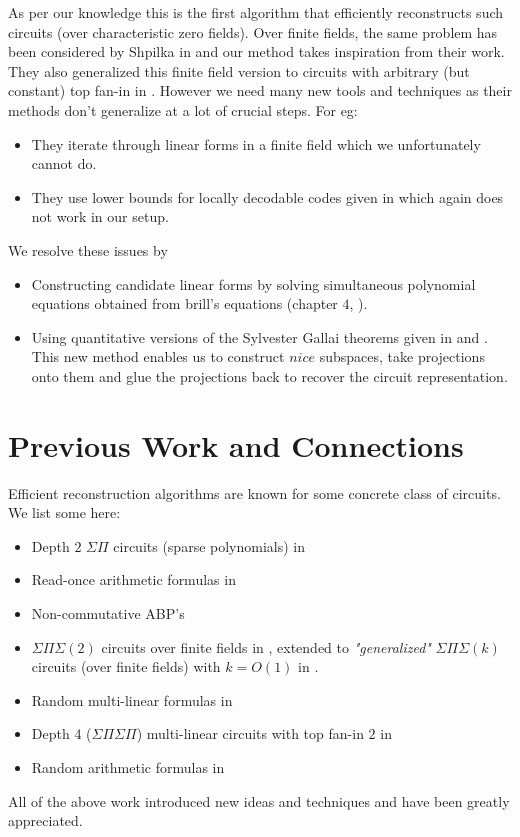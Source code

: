\documentclass[12pt]{caltech_thesis}
\theoremstyle{plain}
\theoremstyle{definition}
\begin{document}
As per our knowledge this is the first algorithm that efficiently
reconstructs such circuits (over characteristic zero fields). Over finite fields, the same problem has been considered by 
Shpilka in \cite{Shpilka07} and
our method takes inspiration from their work. They also generalized this finite field version to circuits with arbitrary (but constant)
top fan-in in \cite{KarShp09}. However we need many new tools and techniques as their methods don't generalize at
a lot of crucial steps. For eg:
\begin{itemize}
\item They iterate through linear forms in a finite field which
we unfortunately cannot do.
\item They use lower bounds for locally decodable codes given in \cite{DS07} which again
does not work in our setup.
\end{itemize}
We resolve these issues by
\begin{itemize}
 \item Constructing candidate linear forms by solving simultaneous polynomial equations obtained from brill's equations (chapter $4$, \cite{GKZ94}).
 \item Using quantitative versions of the Sylvester
Gallai theorems given in \cite{BDWY11} and \cite{DSW12}. This new method enables us to construct $nice$
subspaces, take projections onto them and glue the projections back to recover the circuit representation.
\end{itemize}



\section{Previous Work and Connections}\label{section:previouswork}

Efficient reconstruction algorithms are known for some concrete class of circuits. We
list some here:
\begin{itemize}
 \item Depth $2$ $\Sigma\Pi$ circuits (sparse polynomials) in \cite{KS01}
 \item Read-once arithmetic formulas in \cite{SV09}
 \item Non-commutative ABP's \cite{ArMS08}
 \item $\Sigma\Pi\Sigma(2)$ circuits over finite fields in \cite{Shpilka07}, extended to \emph{"generalized"}
 $\Sigma\Pi\Sigma(k)$ circuits (over finite fields) with $k=O(1)$ in \cite{KarShp09}.
\item Random multi-linear formulas in \cite{GuptaKL11}
\item Depth $4$ ($\Sigma\Pi\Sigma\Pi$) multi-linear circuits with top fan-in $2$ in \cite{GuptaKL12}
\item Random arithmetic formulas in \cite{GKY14}
\end{itemize}
All of the above work introduced new ideas and techniques and have been greatly
appreciated.  
\end{document}

